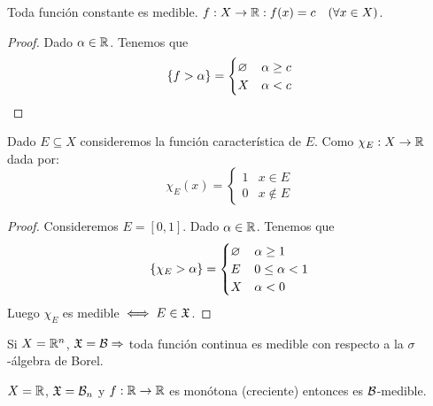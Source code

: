 \begin{eg}
    Toda función constante es medible. \(f: X \to \mathbb{R} : f(x) = c \quad (\forall x \in X)\).
    \begin{proof}
        Dado \(\alpha \in \mathbb{R}\). Tenemos que \begin{equation*}
            \{ f > \alpha \} = \begin{cases}
                \varnothing & \alpha \geq c \\
                X  & \alpha < c
            \end{cases}
        \end{equation*}
    \end{proof}
\end{eg}

\begin{eg}
    Dado \(E \subseteq X\) consideremos la función característica de \(E\). Como \(\chi_E: X \to \mathbb{R}\) dada por:
    \begin{equation*}
        \chi_E(x) = \begin{cases}
            1 & x \in E    \\
            0 & x \notin E
        \end{cases}
    \end{equation*}
    \begin{proof}
        Consideremos \(E = [0, 1]\). Dado \(\alpha \in \mathbb{R}\). Tenemos que \begin{equation*}
            \{ \chi_E > \alpha \} = \begin{cases}
                \varnothing & \alpha \geq 1     \\
                E  & 0 \leq \alpha < 1 \\
                X  & \alpha < 0
            \end{cases}
        \end{equation*}
        Luego \(\chi_E\) es medible \(\iff E \in \mathfrak{X}\).
    \end{proof}
\end{eg}

\begin{eg}
    Si \(X = \mathbb{R}^n\), \(\mathfrak{X} = \mathcal{B} \Rightarrow\) toda función continua es medible con respecto a la \(\sigma\)-álgebra de Borel.
\end{eg}

\begin{eg}
    \(X = \mathbb{R}\), \(\mathfrak{X} = \mathcal{B}_n\) y \(f: \mathbb{R} \to \mathbb{R}\) es monótona (creciente) entonces es \(\mathcal{B}\)-medible.
\end{eg}


